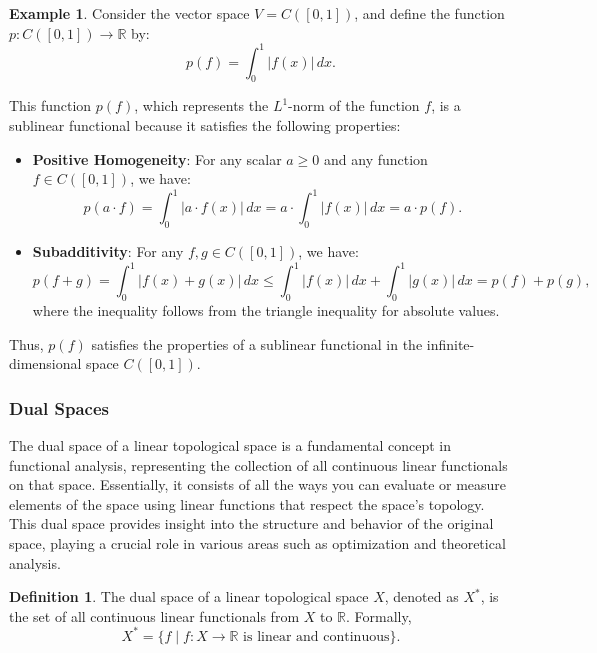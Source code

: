 \documentclass[12pt, reqno]{amsart}
\theoremstyle{definition}
\newtheorem{definition}[theorem]{Definition}
\newtheorem{example}[theorem]{Example}
\numberwithin{equation}{section}
\newcommand{\dR}{{\mathbb R}}
\begin{document}
\begin{example}
    Consider the vector space \( V = C([0, 1]) \), and define the function \( p: C([0, 1]) \to \mathbb{R} \) by:
    $$
    p(f) = \int_0^1 |f(x)| \, dx.
    $$

    This function \( p(f) \), which represents the \( L^1 \)-norm of the function \( f \), is a sublinear functional because it satisfies the following properties:
    
    \begin{itemize}
        \item \textbf{Positive Homogeneity}: For any scalar \( a \geq 0 \) and any function \( f \in C([0, 1]) \), we have:
        $$
        p(a \cdot f) = \int_0^1 |a \cdot f(x)| \, dx = a \cdot \int_0^1 |f(x)| \, dx = a \cdot p(f).
        $$

        \item \textbf{Subadditivity}: For any \( f, g \in C([0, 1]) \), we have:
        $$
        p(f + g) = \int_0^1 |f(x) + g(x)| \, dx \leq \int_0^1 |f(x)| \, dx + \int_0^1 |g(x)| \, dx = p(f) + p(g),
        $$
        where the inequality follows from the triangle inequality for absolute values.
    \end{itemize}

    Thus, \( p(f) \) satisfies the properties of a sublinear functional in the infinite-dimensional space \( C([0, 1]) \).
\end{example}


\subsubsection{Dual Spaces}
The dual space of a linear topological space is a fundamental concept in functional analysis, representing the collection of all continuous linear functionals on that space. Essentially, it consists of all the ways you can evaluate or measure elements of the space using linear functions that respect the space's topology. This dual space provides insight into the structure and behavior of the original space, playing a crucial role in various areas such as optimization and theoretical analysis.
\begin{definition}
    The dual space of a linear topological space $X$, denoted as $X^*$, is the set of all continuous linear functionals from $X$ to $\dR$. Formally,
\[
X^* = \{ f \mid f : X \to \dR \text{ is linear and continuous} \}.
\]
\end{definition}
\pagebreak
\end{document}

